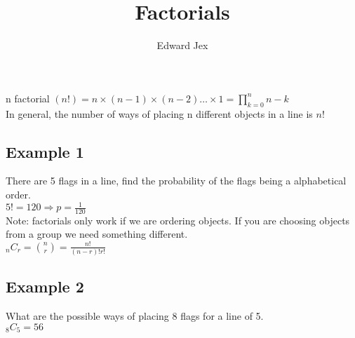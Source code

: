 \documentclass[a4paper,12pt]{article}
\begin{document}
\title{Factorials}	
\author{Edward Jex}
\maketitle
n factorial $(n!) = n \times (n-1) \times (n-2) \dots \times 1 = \prod^{n}_{k=0} n - k$ \\
In general, the number of ways of placing n different objects in a line is $n!$ \\
\subsection*{Example 1}
There are 5 flags in a line, find the probability of the flags being a alphabetical order. \\
$5! = 120 \Rightarrow p = \frac{1}{120}$\\

Note: factorials only work if we are ordering objects. If you are choosing objects from a group we need something different. \\
$_nC_r = {n \choose r} = \frac{n!}{(n-r)!r!}$\\
\subsection*{Example 2}
What are the possible ways of placing 8 flags for a line of 5. \\
$_8C_5 = 56$\\
\end{document}
